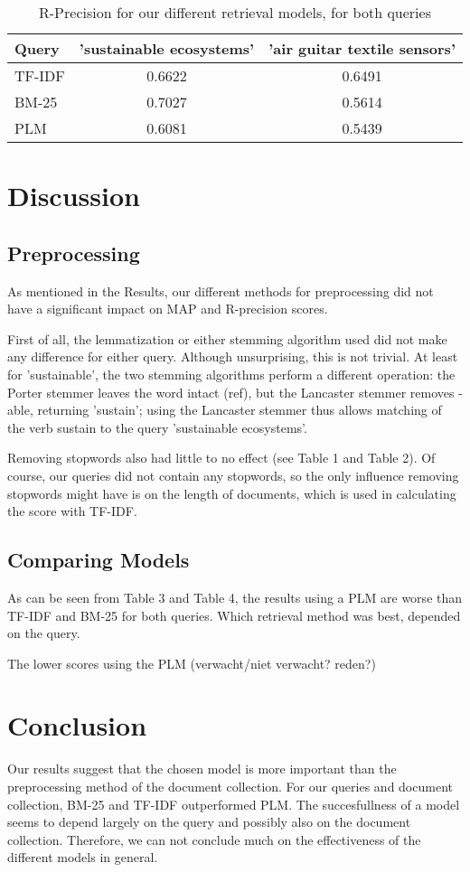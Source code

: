 \documentclass{article}
\begin{document}
\begin{table}[!ht]
\caption{R-Precision for our different retrieval models, for both queries}
\begin{tabular}{|l|c|c|}
\hline
Query & 'sustainable ecosystems' & 'air guitar textile sensors' \\ \hline
TF-IDF & 0.6622 & 0.6491 \\ \hline
BM-25 & 0.7027 & 0.5614 \\ \hline
PLM & 0.6081 & 0.5439 \\ \hline
\end{tabular}
\end{table}

\section*{Discussion}

\subsection*{Preprocessing}

As mentioned in the Results, our different methods for preprocessing did not have a significant impact on MAP and R-precision scores. 

First of all, the lemmatization or either stemming algorithm used did not make any difference for either query. Although unsurprising, this is not trivial. At least for 'sustainable', the two stemming algorithms perform a different operation: the Porter stemmer leaves the word intact (ref), but the Lancaster stemmer removes -able, returning 'sustain'; using the Lancaster stemmer thus allows matching of the verb sustain to the query 'sustainable ecosystems'. 

Removing stopwords also had little to no effect (see Table 1 and Table 2). Of course, our queries did not contain any stopwords, so the only influence removing stopwords might have is on the length of documents, which is used in calculating the score with TF-IDF. 

\subsection*{Comparing Models}

As can be seen from Table 3 and Table 4, the results using a PLM are worse than TF-IDF and BM-25 for both queries. Which retrieval method was best, depended on the query.

The lower scores using the PLM  (verwacht/niet verwacht? reden?)



\section*{Conclusion}

Our results suggest that the chosen model is more important than the preprocessing method of the document collection. For our queries and document collection, BM-25 and TF-IDF outperformed PLM. The succesfullness of a model seems to depend largely on the query and possibly also on the document collection. Therefore, we can not conclude much on the effectiveness of the different models in general.
\end{document}
